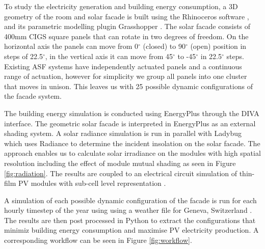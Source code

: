 
To study the electricity generation and building energy consumption, a 3D geometry of the room and solar facade is built using the Rhinoceros software \cite{Rhino}, and its parametric modelling plugin Grasshopper \cite{grasshopper}. The solar facade consists of 400mm CIGS square panels that can rotate in two degrees of freedom. On the horizontal axis the panels can move from 0$^{\circ}$ (closed) to 90$^{\circ}$ (open) position in steps of 22.5$^{\circ}$, in the vertical axis it can move from 45$^{\circ}$ to -45$^{\circ}$ in 22.5$^{\circ}$ steps. Existing ASF systems \cite{nagy2015frontiers} have independently actuated panels and a continuous range of actuation, however for simplicity we group all panels into one cluster that moves in unison. This leaves us with 25 possible dynamic configurations of the facade system. 

The building energy simulation is conducted using EnergyPlus \cite{energyplus} through the DIVA \cite{DIVA} interface. The geometric solar facade is interpreted in EnergyPlus as an external shading system. A solar radiance simulation is run in parallel with Ladybug \cite{roudsari2014ladybug}  which uses Radiance \cite{ward1994radiance} to determine the incident insolation on the solar facade. The approach enables us to calculate solar irradiance on the modules with high spatial resolution including the effect of module mutual shading as seen in Figure \ref{fig:radiation}. The results are coupled to an electrical circuit simulation of thin-film PV modules with sub-cell level representation \cite{hofer2015PVSEC}.

A simulation of each possible dynamic configuration of the facade is run for each hourly timestep of the year using using a weather file for Geneva, Switzerland \cite{genevaweatherfile}. The results are then post processed in Python \cite{python} to extract the configurations that minimiz building energy consumption and maximise PV electricity production. A corresponding workflow can be seen in Figure \ref{fig:workflow}. 




